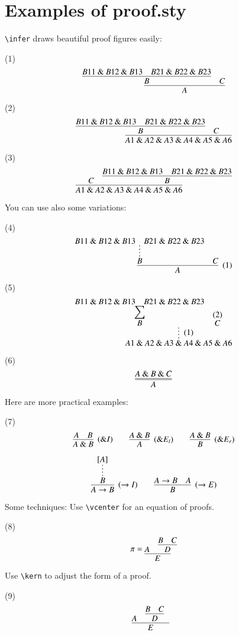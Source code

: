 \documentclass{article}
\def\imp{\to}
\def\land{\mathbin\&}
\begin{document}
\section*{Examples of proof.sty}

\verb|\infer| draws beautiful proof figures easily:

\noindent (1)
$$
\infer{A}{
	\infer{B}{
		B11\land B12\land B13
		&
		B21\land B22\land B23
	}
	&
	C
}
$$

\noindent (2)
$$
\infer{A1\land A2\land A3\land A4\land A5\land A6}{
	\infer{B}{
		B11\land B12\land B13
		&
		B21\land B22\land B23
	}
	&
	C
}
$$

\noindent (3)
$$
\infer{A1\land A2\land A3\land A4\land A5\land A6}{
	C
	&
	\infer{B}{
		B11\land B12\land B13
		&
		B21\land B22\land B23
	}
}
$$

You can use also some variations:

\noindent (4)
$$
\infer[(1)]{A}{
	\infer*{B}{
		B11\land B12\land B13
		&
		B21\land B22\land B23
	}
	&
	C
}
$$

\noindent (5)
$$
\infer*[(1)]{A1\land A2\land A3\land A4\land A5\land A6}{
	\deduce[{\displaystyle \sum}]{B}{
		B11\land B12\land B13
		&
		B21\land B22\land B23
	}
	&
	\deduce{C}{(2)}
}
$$

\noindent (6)
$$
\infer={A}{A \land B \land C}
$$

Here are more practical examples:

\noindent (7)
$$
\infer[(\land I)]{A \land B}{A & B}
\qquad
\infer[(\land E_l)]A{A\land B}
\qquad
\infer[(\land E_r)]B{A\land B}
$$

$$
\infer[(\imp I)]{A \imp B}{
	\infer*{B}{[A]}
}
\qquad
\infer[(\imp E)]{B}{
	A \imp B
	&
	A
}
$$

Some techniques:
Use \verb|\vcenter| for an equation of proofs.

\noindent (8)
$$
\pi = \vcenter{
	\infer{E}{
		A
		&
		\infer{D}{B & C}
	}
}
$$

Use \verb|\kern| to adjust the form of a proof.

\noindent (9)
$$
\infer{E}{
	A
	&
	\infer{D}{B & C} \kern 0.5cm
}
$$
\end{document}
